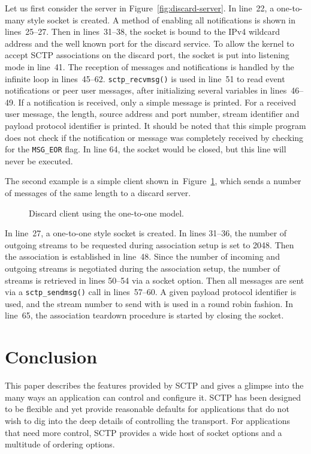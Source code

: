 \documentclass[conference]{IEEEtran}
\begin{document}
Let us first consider the server in Figure~\ref{fig:discard-server}.
In line~22, a one-to-many style socket is created. A method of enabling
all notifications is shown in lines~25--27. Then in lines~31--38,
the socket is bound to the IPv4 wildcard address and the well known port
for the discard service. To allow the kernel to accept SCTP
associations on the discard port, the socket is put into listening
mode in line~41. 
The reception of messages and notifications is handled by the
infinite loop in lines~45--62. \texttt{sctp\_recvmsg()} is used in 
line~51 to read event notifications or peer user messages, after initializing
several variables in lines~46--49. If a notification is received,
only a simple message is printed. For a received user message, the
length, source address and port number, stream identifier and
payload protocol identifier is printed. It should be noted that
this simple program does not check if the notification or message
was completely received by checking for the \texttt{MSG\_EOR} flag.
In line 64, the socket would be closed, but this line will never be
executed.

The second example is a simple client shown in~Figure~\ref{fig:discard-client},
which sends a number of messages of the same length to a discard server.

\begin{figure}[h]
\lstset{numbers=left, frame=single, basicstyle=\small\ttfamily}

\caption{Discard client using the one-to-one model.}
\label{fig:discard-client}
\end{figure}

In line~27, a one-to-one style socket is created. In lines 31--36, the
number of outgoing streams to be requested during association setup
is set to 2048. Then the association is established in line~48. Since 
the number of incoming and outgoing streams is negotiated during the
association setup, the number of streams is retrieved in lines 50--54
via a socket option. Then all messages are sent via a \texttt{sctp\_sendmsg()}
call in lines~57--60. A given payload protocol identifier is used, and the
stream number to send with is used in a round robin fashion. In line~65, the
association teardown procedure is started by closing the socket.

\section{Conclusion}
This paper describes the features provided by SCTP and gives
a glimpse into the many ways an application can control and
configure it. SCTP has been designed to be flexible and
yet provide reasonable defaults for applications that do
not wish to dig into the deep details of controlling the
transport. For applications that need more control, SCTP
provides a wide host of socket options and a multitude of
ordering options. 
\end{document}
